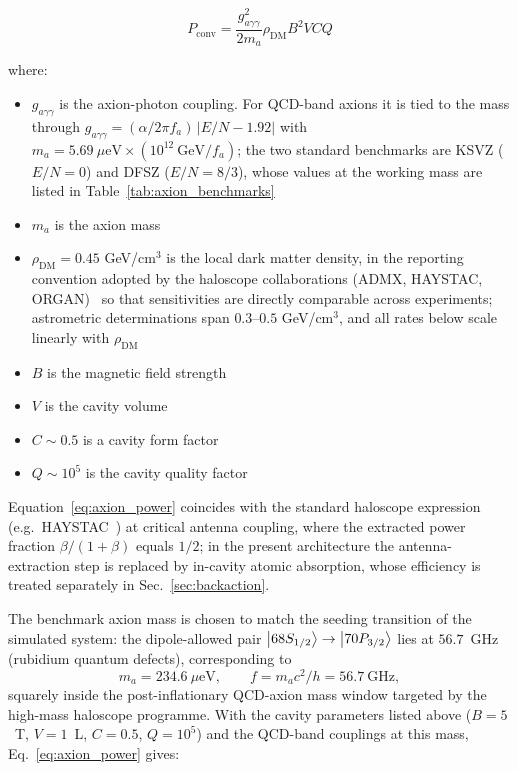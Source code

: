 \begin{equation}
    P_{\mathrm{conv}} = \frac{g_{a\gamma\gamma}^2}{2m_a} \rho_{\mathrm{DM}} B^2 V C Q
    \label{eq:axion_power}
\end{equation}

where:
\begin{itemize}
    \item $g_{a\gamma\gamma}$ is the axion-photon coupling. For QCD-band
    axions it is tied to the mass through
    $g_{a\gamma\gamma} = (\alpha/2\pi f_a)\,|E/N - 1.92|$ with
    $m_a = 5.69~\mu\mathrm{eV} \times (10^{12}~\mathrm{GeV}/f_a)$;
    the two standard benchmarks are KSVZ ($E/N = 0$) and DFSZ
    ($E/N = 8/3$), whose values at the working mass are listed in
    Table~\ref{tab:axion_benchmarks}
    \item $m_a$ is the axion mass
    \item $\rho_{\mathrm{DM}} = 0.45$ GeV/cm$^3$ is the local dark matter
    density, in the reporting convention adopted by the haloscope
    collaborations (ADMX, HAYSTAC, ORGAN)~\cite{Zhong2018, Backes2021} so
    that sensitivities are directly comparable across experiments;
    astrometric determinations span $0.3$--$0.5$ GeV/cm$^3$, and all rates
    below scale linearly with $\rho_{\mathrm{DM}}$
    \item $B$ is the magnetic field strength
    \item $V$ is the cavity volume
    \item $C \sim 0.5$ is a cavity form factor
    \item $Q \sim 10^5$ is the cavity quality factor
\end{itemize}

Equation~\eqref{eq:axion_power} coincides with the standard haloscope
expression (e.g.\ HAYSTAC~\cite{Zhong2018}) at critical antenna coupling,
where the extracted power fraction $\beta/(1+\beta)$ equals $1/2$; in the
present architecture the antenna-extraction step is replaced by in-cavity
atomic absorption, whose efficiency is treated separately in
Sec.~\ref{sec:backaction}.

The benchmark axion mass is chosen to match the seeding transition of the
simulated system: the dipole-allowed pair
$\ket{68S_{1/2}} \to \ket{70P_{3/2}}$ lies at $56.7$~GHz (rubidium quantum
defects), corresponding to
\begin{equation}
    m_a = 234.6~\mu\mathrm{eV}, \qquad f = m_a c^2/h = 56.7~\mathrm{GHz},
\end{equation}
squarely inside the post-inflationary QCD-axion mass window targeted by the
high-mass haloscope programme. With the cavity parameters listed above
($B = 5$~T, $V = 1$~L, $C = 0.5$, $Q = 10^5$) and the QCD-band couplings at
this mass, Eq.~\eqref{eq:axion_power} gives:

